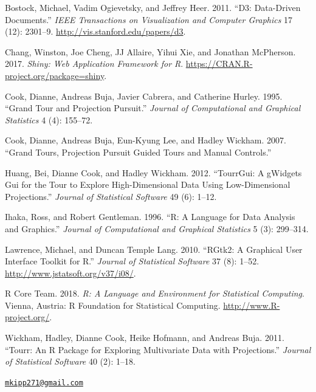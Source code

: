 \hypertarget{refs}{}
\leavevmode\hypertarget{ref-D3}{}%
Bostock, Michael, Vadim Ogievetsky, and Jeffrey Heer. 2011. ``D3:
Data-Driven Documents.'' \emph{IEEE Transactions on Visualization and
Computer Graphics} 17 (12): 2301--9.
\url{http://vis.stanford.edu/papers/d3}.

\leavevmode\hypertarget{ref-shiny}{}%
Chang, Winston, Joe Cheng, JJ Allaire, Yihui Xie, and Jonathan
McPherson. 2017. \emph{Shiny: Web Application Framework for R}.
\url{https://CRAN.R-project.org/package=shiny}.

\leavevmode\hypertarget{ref-gt_pp}{}%
Cook, Dianne, Andreas Buja, Javier Cabrera, and Catherine Hurley. 1995.
``Grand Tour and Projection Pursuit.'' \emph{Journal of Computational
and Graphical Statistics} 4 (4): 155--72.

\leavevmode\hypertarget{ref-gt_pp_mc}{}%
Cook, Dianne, Andreas Buja, Eun-Kyung Lee, and Hadley Wickham. 2007.
``Grand Tours, Projection Pursuit Guided Tours and Manual Controls.''

\leavevmode\hypertarget{ref-tourrGui}{}%
Huang, Bei, Dianne Cook, and Hadley Wickham. 2012. ``TourrGui: A
gWidgets Gui for the Tour to Explore High-Dimensional Data Using
Low-Dimensional Projections.'' \emph{Journal of Statistical Software} 49
(6): 1--12.

\leavevmode\hypertarget{ref-ihaka:1996}{}%
Ihaka, Ross, and Robert Gentleman. 1996. ``R: A Language for Data
Analysis and Graphics.'' \emph{Journal of Computational and Graphical
Statistics} 5 (3): 299--314.

\leavevmode\hypertarget{ref-RGtk2}{}%
Lawrence, Michael, and Duncan Temple Lang. 2010. ``RGtk2: A Graphical
User Interface Toolkit for R.'' \emph{Journal of Statistical Software}
37 (8): 1--52. \url{http://www.jstatsoft.org/v37/i08/}.

\leavevmode\hypertarget{ref-R}{}%
R Core Team. 2018. \emph{R: A Language and Environment for Statistical
Computing}. Vienna, Austria: R Foundation for Statistical Computing.
\url{http://www.R-project.org/}.

\leavevmode\hypertarget{ref-tourr}{}%
Wickham, Hadley, Dianne Cook, Heike Hofmann, and Andreas Buja. 2011.
``Tourr: An R Package for Exploring Multivariate Data with
Projections.'' \emph{Journal of Statistical Software} 40 (2): 1--18.



\address{%
Michael Kipp\\
Monash University\\
Department of Econometrics and Business Statistics\\
}
\href{mailto:mkipp271@gmail.com}{\nolinkurl{mkipp271@gmail.com}}

